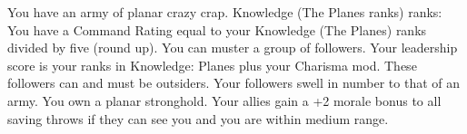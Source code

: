 \skillfeat
{You have an army of planar crazy crap.}
{Knowledge (The Planes ranks) ranks:}
{You have a Command Rating equal to your Knowledge (The Planes) ranks divided by five (round up).}
{You can muster a group of followers. Your leadership score is your ranks in Knowledge: Planes plus your Charisma mod. These followers can and must be outsiders.}
{Your followers swell in number to that of an army.}
{You own a planar stronghold.}
{Your allies gain a +2 morale bonus to all saving throws if they can see you and you are within medium range.}